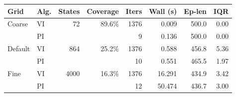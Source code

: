 \begin{tabular}{llrrrrrr}
\hline
\textbf{Grid} & \textbf{Alg.} & \textbf{States} & \textbf{Coverage} & \textbf{Iters} & \textbf{Wall (s)} & \textbf{Ep-len} & \textbf{IQR} \\
\hline
Coarse & VI & 72 & 89.6\% & 1376 & 0.009 & 500.0 & 0.00 \\
 & PI &  &  & 9 & 0.136 & 500.0 & 0.00 \\
\hline
Default & VI & 864 & 25.2\% & 1376 & 0.588 & 456.8 & 5.36 \\
 & PI &  &  & 10 & 0.551 & 465.5 & 1.97 \\
\hline
Fine & VI & 4000 & 16.3\% & 1376 & 16.291 & 434.9 & 3.42 \\
 & PI &  &  & 12 & 50.474 & 436.7 & 3.00 \\
\hline
\end{tabular}
